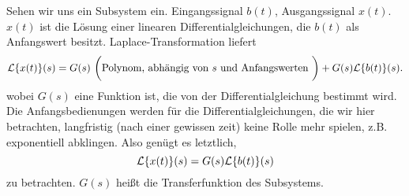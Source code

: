 Sehen wir uns ein Subsystem ein. Eingangssignal $b(t)$, Ausgangssignal $x(t)$. 
$x(t)$ ist die L\"osung einer linearen Differentialgleichungen, die $b(t)$ 
als Anfangswert besitzt. Laplace-Transformation liefert 
$$
{\cal L}\{x(t)\}(s) 
= G(s)\,\,\bigg(\mbox{Polynom, abh\"angig von  }s\mbox{ und Anfangswerten }\bigg)
+ G(s) {\cal L}\{b(t)\}(s). 
$$
wobei $G(s)$ eine Funktion ist, die von der Differentialgleichung bestimmt wird. 
Die Anfangsbedienungen werden f\"ur die Differentialgleichungen, die wir hier betrachten, 
langfristig (nach einer gewissen zeit) keine Rolle mehr spielen, 
z.B. exponentiell abklingen.
Also gen\"ugt es letztlich, 
$$
{\cal L}\{x(t)\}(s) 
= G(s) {\cal L}\{b(t)\}(s) 
$$
zu betrachten. $G(s)$ hei\ss{}t die Transferfunktion des Subsystems. \par\bigskip

